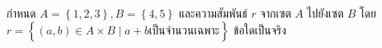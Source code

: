 ﻿%
\question กำหนด $A=\left\{1,2,3\right\}, B=\left\{4,5\right\}$ และความสัมพันธ์ $r$ จากเซต $A$ ไปยังเซต $B$ \newline
โดย $r = \left\{(a, b) \in A\times B \mid  a + b  \text{เป็นจำนวนเฉพาะ} \right\}$ ข้อใดเป็นจริง \newline
{}
